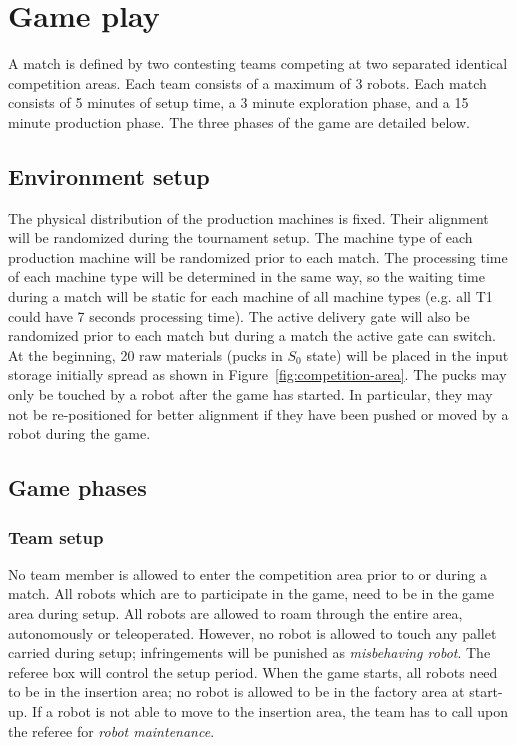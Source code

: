 \documentclass[12pt,twoside]{article}
\newcommand{\reffig}[1]{Figure~\ref{#1}}
\begin{document}

\section{Game play}
A match is defined by two contesting teams competing at two separated
identical competition areas. Each team consists of a maximum of 3
robots. Each match consists of 5 minutes of setup time,
a 3 minute exploration phase, and a 15 minute production phase.
The three phases of the game are detailed below.

\subsection{Environment setup}
\label{sec:env-setup}

The physical distribution of the production machines is fixed. Their
alignment will be randomized during the tournament setup. The machine
type of each production machine will be randomized prior to each
match. The processing time of each machine type will be determined in
the same way, so the waiting time during a match will be static for
each machine of all machine types (e.g. all T1 could have 7 seconds
processing time). The active delivery gate will also be randomized
prior to each match but during a match the active gate can switch.  At
the beginning, 20 raw materials (pucks in $S_0$ state) will be placed
in the input storage initially spread as shown in
\reffig{fig:competition-area}. The pucks may only be touched by a
robot after the game has started. In particular, they may not be
re-positioned for better alignment if they have been pushed or moved by
a robot during the game.

\subsection{Game phases}
\label{sec:game-phases}

\subsubsection{Team setup}
\label{sec:team-setup}
No team member is allowed to enter the competition area prior to or
during a match. All robots which are to participate in the game, need
to be in the game area during setup. All robots are allowed to roam
through the entire area, autonomously or teleoperated. However, no
robot is allowed to touch any pallet carried during setup;
infringements will be punished as \textit{misbehaving robot}. The
referee box will control the setup period. When the game starts, all
robots need to be in the insertion area; no robot is allowed to be in
the factory area at start-up. If a robot is not able to move to the
insertion area, the team has to call upon the referee for
\textit{robot maintenance}.
\end{document}
